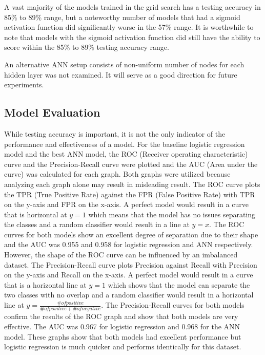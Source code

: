 \documentclass[letterpaper, 12 pt, conference]{ieeeconf}  %
\begin{document}
A vast majority of the models trained in the grid search has a testing accuracy in 85\% to 89\% range, but a noteworthy number of models that had a sigmoid activation function did significantly worse in the 57\% range. It is worthwhile to note that models with the sigmoid activation function did still have the ability to score within the 85\% to 89\% testing accuracy range.

An alternative ANN setup consists of non-uniform number of nodes for each hidden layer was not examined. It will serve as a good direction for future experiments.

\subsection{Model Evaluation}

While testing accuracy is important, it is not the only indicator of the performance and effectiveness of a model. For the baseline logistic regression model and the best ANN model, the ROC (Receiver operating characteristic) curve and the Precision-Recall curve were plotted and the AUC (Area under the curve) was calculated for each graph. Both graphs were utilized because analyzing each graph alone may result in misleading result. The ROC curve plots the TPR (True Positive Rate) against the FPR (False Positive Rate) with TPR on the y-axis and FPR on the x-axis. A perfect model would result in a curve that is horizontal at $y = 1$ which means that the model has no issues separating the classes and a random classifier would result in a line at $y=x$. The ROC curves for both models show an excellent degree of separation due to their shape and the AUC was 0.955 and 0.958 for logistic regression and ANN respectively. However, the shape of the ROC curve can be influenced by an imbalanced dataset. The Precision-Recall curve plots Precision against Recall with Precision on the y-axis and Recall on the x-axis. A perfect model would result in a curve that is a horizontal line at $y=1$ which shows that the model can separate the two classes with no overlap and a random classifier would result in a horizontal line at $y = \frac{\# of positive}{\# of positive + \# of negative}$. The Precision-Recall curves for both models confirm the results of the ROC graph and show that both models are very effective. The AUC was 0.967 for logistic regression and 0.968 for the ANN model. These graphs show that both models had excellent performance but logistic regression is much quicker and performs identically for this dataset.
\end{document}
